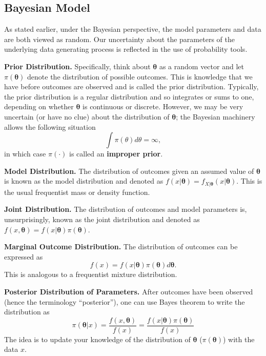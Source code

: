\documentclass[]{book}
\theoremstyle{definition}
\theoremstyle{definition}
\theoremstyle{definition}
\theoremstyle{remark}
\begin{document}
\subsection{Bayesian Model}\label{bayesian-model}

As stated earlier, under the Bayesian perspective, the model parameters
and data are both viewed as random. Our uncertainty about the parameters
of the underlying data generating process is reflected in the use of
probability tools.

\textbf{Prior Distribution.} Specifically, think about
\(\boldsymbol \theta\) as a random vector and let
\(\pi(\boldsymbol \theta)\) denote the distribution of possible
outcomes. This is knowledge that we have before outcomes are observed
and is called the prior distribution. Typically, the prior distribution
is a regular distribution and so integrates or sums to one, depending on
whether \(\boldsymbol \theta\) is continuous or discrete. However, we
may be very uncertain (or have no clue) about the distribution of
\(\boldsymbol \theta\); the Bayesian machinery allows the following
situation \[\int \pi(\theta) d\theta = \infty,\] in which case
\(\pi(\cdot)\) is called an \textbf{improper prior}.

\textbf{Model Distribution.} The distribution of outcomes given an
assumed value of \(\boldsymbol \theta\) is known as the model
distribution and denoted as
\(f(x | \boldsymbol \theta) = f_{X|\boldsymbol \theta} (x|\boldsymbol \theta )\).
This is the usual frequentist mass or density function.

\textbf{Joint Distribution.} The distribution of outcomes and model
parameters is, unsurprisingly, known as the joint distribution and
denoted as
\(f(x , \boldsymbol \theta) = f(x|\boldsymbol \theta )\pi(\boldsymbol \theta)\).

\textbf{Marginal Outcome Distribution.} The distribution of outcomes can
be expressed as
\[f(x) = f(x | \boldsymbol \theta)\pi(\boldsymbol \theta) d\boldsymbol \theta.\]
This is analogous to a frequentist mixture distribution.

\textbf{Posterior Distribution of Parameters.} After outcomes have been
observed (hence the terminology ``posterior''), one can use Bayes
theorem to write the distribution as
\[\pi(\boldsymbol \theta | x) =\frac{f(x , \boldsymbol \theta)}{f(x)} =\frac{f(x|\boldsymbol \theta )\pi(\boldsymbol \theta)}{f(x)}\]
The idea is to update your knowledge of the distribution of
\(\boldsymbol \theta\) (\(\pi(\boldsymbol \theta)\)) with the data
\(x\).
\end{document}
